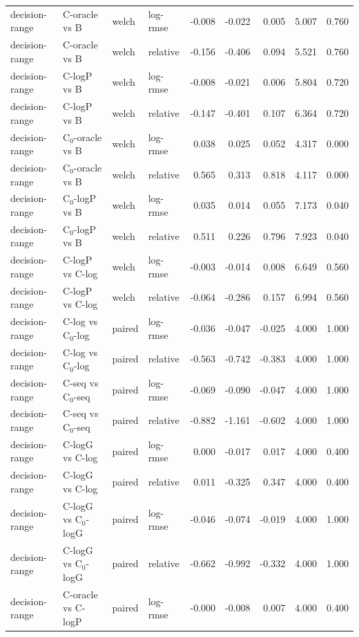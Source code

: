 \begin{longtable}{llllrrrrr}
decision-range & C-oracle vs B & welch & log-rmse & -0.008 & -0.022 & 0.005 & 5.007 & 0.760 \\
decision-range & C-oracle vs B & welch & relative & -0.156 & -0.406 & 0.094 & 5.521 & 0.760 \\
decision-range & C-logP vs B & welch & log-rmse & -0.008 & -0.021 & 0.006 & 5.804 & 0.720 \\
decision-range & C-logP vs B & welch & relative & -0.147 & -0.401 & 0.107 & 6.364 & 0.720 \\
decision-range & C$_0$-oracle vs B & welch & log-rmse & 0.038 & 0.025 & 0.052 & 4.317 & 0.000 \\
decision-range & C$_0$-oracle vs B & welch & relative & 0.565 & 0.313 & 0.818 & 4.117 & 0.000 \\
decision-range & C$_0$-logP vs B & welch & log-rmse & 0.035 & 0.014 & 0.055 & 7.173 & 0.040 \\
decision-range & C$_0$-logP vs B & welch & relative & 0.511 & 0.226 & 0.796 & 7.923 & 0.040 \\
decision-range & C-logP vs C-log & welch & log-rmse & -0.003 & -0.014 & 0.008 & 6.649 & 0.560 \\
decision-range & C-logP vs C-log & welch & relative & -0.064 & -0.286 & 0.157 & 6.994 & 0.560 \\
decision-range & C-log vs C$_0$-log & paired & log-rmse & -0.036 & -0.047 & -0.025 & 4.000 & 1.000 \\
decision-range & C-log vs C$_0$-log & paired & relative & -0.563 & -0.742 & -0.383 & 4.000 & 1.000 \\
decision-range & C-seq vs C$_0$-seq & paired & log-rmse & -0.069 & -0.090 & -0.047 & 4.000 & 1.000 \\
decision-range & C-seq vs C$_0$-seq & paired & relative & -0.882 & -1.161 & -0.602 & 4.000 & 1.000 \\
decision-range & C-logG vs C-log & paired & log-rmse & 0.000 & -0.017 & 0.017 & 4.000 & 0.400 \\
decision-range & C-logG vs C-log & paired & relative & 0.011 & -0.325 & 0.347 & 4.000 & 0.400 \\
decision-range & C-logG vs C$_0$-logG & paired & log-rmse & -0.046 & -0.074 & -0.019 & 4.000 & 1.000 \\
decision-range & C-logG vs C$_0$-logG & paired & relative & -0.662 & -0.992 & -0.332 & 4.000 & 1.000 \\
decision-range & C-oracle vs C-logP & paired & log-rmse & -0.000 & -0.008 & 0.007 & 4.000 & 0.400 \\

\end{longtable}
